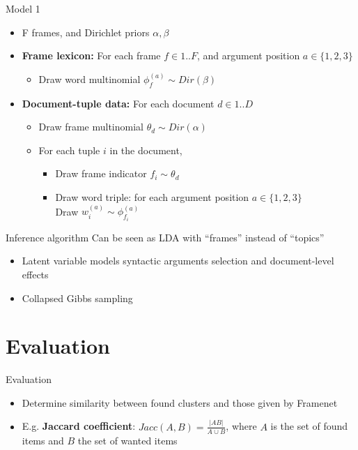 \documentclass[xcolor=svgnames,handout]{beamer}
\begin{document}
\begin{frame}{Model 1}
	\begin{itemize}
		\item F frames, and Dirichlet priors $\alpha, \beta$
		\item \textbf{Frame lexicon:} For each frame $f \in 1..F$, and argument position $a \in \{ 1,2,3\}$
		\begin{itemize}
			\item Draw word multinomial $\phi_f^{(a)} \sim Dir(\beta)$
		\end{itemize}
		\item \textbf{Document-tuple data:} For each document $d \in 1..D$
		\begin{itemize}
			\item Draw frame multinomial $\theta_d \sim Dir(\alpha)$
			\item For each tuple $i$ in the document,
			\begin{itemize}
				\item Draw frame indicator $f_i \sim \theta_d$
				\item Draw word triple: for each argument position $a \in \{ 1,2,3\}$\\
				\hspace{0.5cm} Draw $w_i^{(a)} \sim \phi_{f_i}^{(a)}$
			\end{itemize}
		\end{itemize}
	\end{itemize}
	\begin{block}{Inference algorithm}
		Can be seen as LDA with ``frames'' instead of ``topics''
		\begin{itemize}
			\item Latent variable models syntactic arguments selection and document-level effects
			\item Collapsed Gibbs sampling
		\end{itemize}
	\end{block}
\end{frame}

\section{Evaluation}
\begin{frame}{Evaluation}
	\begin{itemize}
		\item Determine similarity between found clusters and those given by Framenet
		\item E.g. \textbf{Jaccard coefficient}: $Jacc(A,B) = \frac{|AB|}{A\cup B}$, where $A$ is the set of found items and $B$ the set of wanted items
	\end{itemize}
\end{frame}

\end{document}
